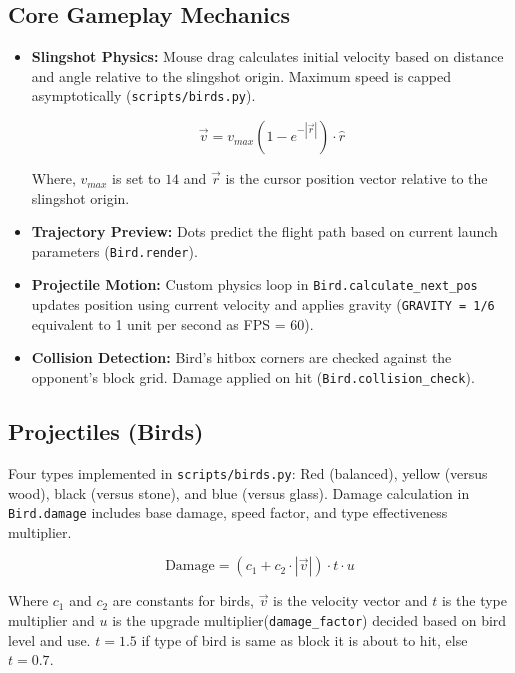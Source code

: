 \documentclass[11pt, a4paper]{article}
\begin{document}
\subsection{Core Gameplay Mechanics}

\begin{itemize}

    \item \textbf{Slingshot Physics:} Mouse drag calculates initial velocity based on distance and angle relative to the slingshot origin. Maximum speed is capped asymptotically (\texttt{scripts/birds.py}).
    
    \[\vec{v}=v_{max}(1-e^{-|\vec{r}|})\cdot\hat{r}\]
    
    Where, $v_{max}$ is set to $14$ and $\vec{r}$ is the cursor position vector relative to the slingshot origin.
    
    \item \textbf{Trajectory Preview:} Dots predict the flight path based on current launch parameters (\texttt{Bird.render}).
    
    \item \textbf{Projectile Motion:} Custom physics loop in \texttt{Bird.calculate\_next\_pos} updates position using current velocity and applies gravity (\texttt{GRAVITY = 1/6} equivalent to 1 unit per second as FPS = 60).
    
    \item \textbf{Collision Detection:} Bird's hitbox corners are checked against the opponent's block grid. Damage applied on hit (\texttt{Bird.collision\_check}).

\end{itemize}

\subsection{Projectiles (Birds)}

Four types implemented in \texttt{scripts/birds.py}: Red (balanced), yellow (versus wood), black (versus stone), and blue (versus glass). Damage calculation in \texttt{Bird.damage} includes base damage, speed factor, and type effectiveness multiplier.

\[\text{Damage}=(c_1+c_2\cdot|\vec{v}|)\cdot t\cdot u\]

Where $c_1$ and $c_2$ are constants for birds, $\vec{v}$ is the velocity vector and $t$ is the type multiplier and $u$ is the upgrade multiplier(\texttt{damage\_factor}) decided based on bird level and use. $t=1.5$ if type of bird is same as block it is about to hit, else $t=0.7$.
\end{document}
